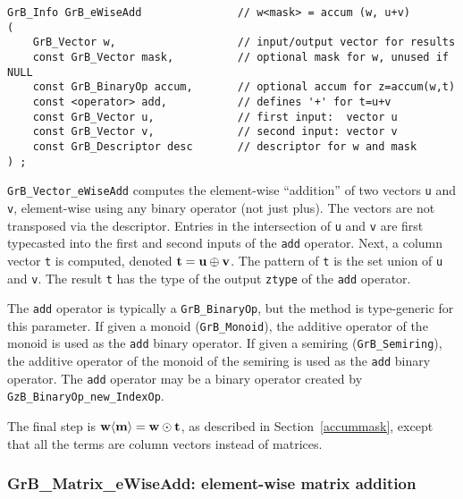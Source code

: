 \documentclass[12pt]{article}
\begin{document}
\begin{mdframed}[userdefinedwidth=6in]
{\footnotesize
\begin{verbatim}
GrB_Info GrB_eWiseAdd               // w<mask> = accum (w, u+v)
(
    GrB_Vector w,                   // input/output vector for results
    const GrB_Vector mask,          // optional mask for w, unused if NULL
    const GrB_BinaryOp accum,       // optional accum for z=accum(w,t)
    const <operator> add,           // defines '+' for t=u+v
    const GrB_Vector u,             // first input:  vector u
    const GrB_Vector v,             // second input: vector v
    const GrB_Descriptor desc       // descriptor for w and mask
) ;
\end{verbatim} } \end{mdframed}

\verb'GrB_Vector_eWiseAdd' computes the element-wise ``addition'' of two
vectors \verb'u' and \verb'v', element-wise using any binary operator (not just
plus).  The vectors are not transposed via the descriptor.  Entries in the
intersection of \verb'u' and \verb'v' are first typecasted into the first and
second inputs of the \verb'add' operator.  Next, a column vector \verb't' is
computed, denoted ${\bf t = u \oplus v}$.  The pattern of \verb't' is the set
union of \verb'u' and \verb'v'.  The result \verb't' has the type of the output
\verb'ztype' of the \verb'add' operator.

The \verb'add' operator is typically a \verb'GrB_BinaryOp', but the method is
type-generic for this parameter.  If given a monoid (\verb'GrB_Monoid'), the
additive operator of the monoid is used as the \verb'add' binary operator.  If
given a semiring (\verb'GrB_Semiring'), the additive operator of the monoid of
the semiring is used as the \verb'add' binary operator.
%
The \verb'add' operator may be a binary operator
created by \verb'GzB_BinaryOp_new_IndexOp'.

The final step is ${\bf w \langle m \rangle  = w \odot t}$, as described in
Section~\ref{accummask}, except that all the terms are column vectors instead
of matrices.

\subsubsection{{\sf GrB\_Matrix\_eWiseAdd:} element-wise matrix addition}
\label{eWiseAdd_matrix}
\end{document}
